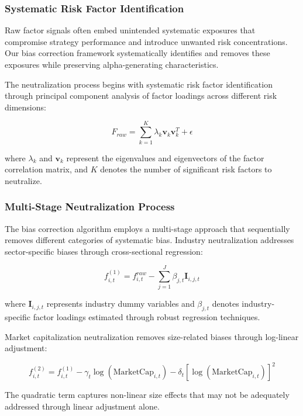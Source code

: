 \documentclass[conference]{IEEEtran}
\begin{document}
\subsubsection{Systematic Risk Factor Identification}

Raw factor signals often embed unintended systematic exposures that compromise strategy performance and introduce unwanted risk concentrations. Our bias correction framework systematically identifies and removes these exposures while preserving alpha-generating characteristics.

The neutralization process begins with systematic risk factor identification through principal component analysis of factor loadings across different risk dimensions:

\begin{equation}
F_{raw} = \sum_{k=1}^K \lambda_k \mathbf{v}_k \mathbf{v}_k^T + \epsilon
\end{equation}

where $\lambda_k$ and $\mathbf{v}_k$ represent the eigenvalues and eigenvectors of the factor correlation matrix, and $K$ denotes the number of significant risk factors to neutralize.

\subsubsection{Multi-Stage Neutralization Process}

The bias correction algorithm employs a multi-stage approach that sequentially removes different categories of systematic bias. Industry neutralization addresses sector-specific biases through cross-sectional regression:

\begin{equation}
f_{i,t}^{(1)} = f_{i,t}^{raw} - \sum_{j=1}^{J} \beta_{j,t} \mathbf{I}_{i,j,t}
\end{equation}

where $\mathbf{I}_{i,j,t}$ represents industry dummy variables and $\beta_{j,t}$ denotes industry-specific factor loadings estimated through robust regression techniques.

Market capitalization neutralization removes size-related biases through log-linear adjustment:

\begin{equation}
f_{i,t}^{(2)} = f_{i,t}^{(1)} - \gamma_t \log(\text{MarketCap}_{i,t}) - \delta_t [\log(\text{MarketCap}_{i,t})]^2
\end{equation}

The quadratic term captures non-linear size effects that may not be adequately addressed through linear adjustment alone.
\end{document}
